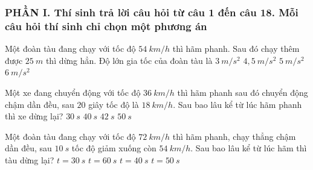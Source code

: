\subsubsection*{PHẦN I. Thí sinh trả lời câu hỏi từ câu 1 đến câu 18. Mỗi câu hỏi thí sinh chỉ chọn một phương án}
\setcounter{ex}{0}
\begin{ex}%
Một đoàn tàu đang chạy với tốc độ $54\ km/h$ thì hãm phanh. Sau đó chạy thêm được $25\ m$ thì dừng hẳn. Độ lớn gia tốc của đoàn tàu là
\choice
{$3\ m/s^2$}
{\True $4,5\ m/s^2$}
{$5\ m/s^2$}
{$6\ m/s^2$}
\end{ex}
\begin{ex}%
Một xe đang chuyển động với tốc độ $36\ km/h$ thì hãm phanh sau đó chuyển động chậm dần đều, sau $20$ giây tốc độ là $18\ km/h$. Sau bao lâu kể từ lúc hãm phanh thì xe dừng lại?
\choice
{$30\ s$}
{\True $40\ s$}
{$42\ s$}
{$50\ s$}	
 \end{ex}
\begin{ex}%
Một đoàn tàu đang chạy với tốc độ $72\ km/h$ thì hãm phanh, chạy thẳng chậm dần đều, sau $10\ s$ tốc độ giảm xuống còn $54\ km/h$. Sau bao lâu kể từ lúc hãm thì tàu dừng lại?
\choice
{$t = 30\ s$}
{$t = 60\ s$}
{\True $t = 40\ s$}
{$t = 50\ s$}	
 \end{ex}
